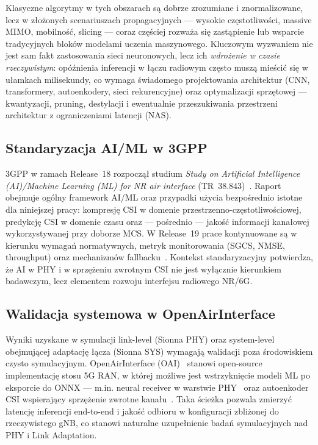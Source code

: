 \documentclass[12pt, a4paper]{article}
\begin{document}
Klasyczne algorytmy w tych obszarach są dobrze zrozumiane i znormalizowane, lecz w złożonych scenariuszach propagacyjnych --- wysokie częstotliwości, massive MIMO, mobilność, slicing --- coraz częściej rozważa się zastąpienie lub wsparcie tradycyjnych bloków modelami uczenia maszynowego. Kluczowym wyzwaniem nie jest sam fakt zastosowania sieci neuronowych, lecz ich \emph{wdrożenie w czasie rzeczywistym}: opóźnienia inferencji w łączu radiowym często muszą mieścić się w ułamkach milisekundy, co wymaga świadomego projektowania architektur (CNN, transformery, autoenkodery, sieci rekurencyjne) oraz optymalizacji sprzętowej --- kwantyzacji, pruning, destylacji i ewentualnie przeszukiwania przestrzeni architektur z ograniczeniami latencji (NAS).

\subsection{Standaryzacja AI/ML w 3GPP}

3GPP w ramach Release~18 rozpoczął studium \emph{Study on Artificial Intelligence (AI)/Machine Learning (ML) for NR air interface} (TR~38.843)~\cite{3gpp-38843}. Raport obejmuje ogólny framework AI/ML oraz przypadki użycia bezpośrednio istotne dla niniejszej pracy: kompresję CSI w domenie przestrzenno-częstotliwościowej, predykcję CSI w domenie czasu oraz --- pośrednio --- jakość informacji kanałowej wykorzystywanej przy doborze MCS. W Release~19 prace kontynuowane są w kierunku wymagań normatywnych, metryk monitorowania (SGCS, NMSE, throughput) oraz mechanizmów fallbacku~\cite{3gpp-38843,ieee-comsoc-r18-ai}. Kontekst standaryzacyjny potwierdza, że AI w PHY i w sprzężeniu zwrotnym CSI nie jest wyłącznie kierunkiem badawczym, lecz elementem rozwoju interfejsu radiowego NR/6G.

\subsection{Walidacja systemowa w OpenAirInterface}

Wyniki uzyskane w symulacji link-level (Sionna PHY) oraz system-level obejmującej adaptację łącza (Sionna SYS) wymagają walidacji poza środowiskiem czysto symulacyjnym. OpenAirInterface (OAI)~\cite{oai} stanowi open-source implementację stosu 5G RAN, w której możliwe jest wstrzyknięcie modeli ML po eksporcie do ONNX --- m.in. neural receiver w warstwie PHY~\cite{neural-rx-repo,sionna-rk} oraz autoenkoder CSI wspierający sprzężenie zwrotne kanału~\cite{cheng-oai-csi-2024}. Taka ścieżka pozwala zmierzyć latencję inferencji end-to-end i jakość odbioru w konfiguracji zbliżonej do rzeczywistego gNB, co stanowi naturalne uzupełnienie badań symulacyjnych nad PHY i Link Adaptation.
\end{document}
